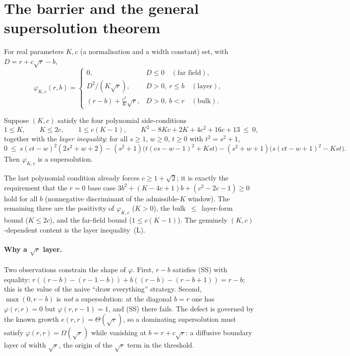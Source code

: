 \section{The barrier and the general supersolution theorem}

\begin{definition}\label{def:phiBar}
\leanok
{}
For real parameters $K,c$ (a normalisation and a width constant) set, with
$D=r+c\sqrt r-b$,
\[
  \varphi_{K,c}(r,b)=
  \begin{cases}
    0, & D\le 0 \quad(\text{far field}),\\[2pt]
    D^2/(K\sqrt r), & D>0,\ r\le b \quad(\text{layer}),\\[2pt]
    (r-b)+\tfrac{c^2}{K}\sqrt r, & D>0,\ b<r \quad(\text{bulk}).
  \end{cases}
\]
\end{definition}

\begin{theorem}\label{thm:general}
\leanok
{}
Suppose $(K,c)$ satisfy the four polynomial side-conditions
\[
  1\le K,\qquad K\le 2c,\qquad 1\le c(K-1),\qquad
  K^2-8Kc+2K+4c^2+16c+13\ \le\ 0,
\]
together with the \emph{layer inequality}: for all $s\ge1$, $w\ge0$, $t\ge0$ with
$t^2=s^2+1$,
\[
  0\ \le\ s(ct-w)^2(2s^2+w+2)-(s^2+1)\big(t(cs-w-1)^2+Kst\big)
          -(s^2+w+1)\big(s(ct-w+1)^2-Kst\big). \tag{L}
\]
Then $\varphi_{K,c}$ is a supersolution.
\end{theorem}

The last polynomial condition already forces $c\ge 1+\sqrt2$; it is exactly the
requirement that the $r=0$ base case $3b^2+(K-4c+1)b+(c^2-2c-1)\ge0$ hold for all
$b$ (nonnegative discriminant of the admissible-$K$ window). The remaining three
are the positivity of $\varphi_{K,c}$ ($K>0$), the bulk~$\le$~layer-form bound
($K\le2c$), and the far-field bound ($1\le c(K-1)$). The genuinely
$(K,c)$-dependent content is the layer inequality~(L).

\paragraph{Why a $\sqrt r$ layer.}
Two observations constrain the shape of $\varphi$. First, $r-b$ satisfies (SS) with
equality: $r((r-b)-(r-1-b))+b((r-b)-(r-b+1))=r-b$; this is the value of the naive
``draw everything'' strategy. Second, $\max(0,r-b)$ is \emph{not} a supersolution:
at the diagonal $b=r$ one has $\varphi(r,r)=0$ but $\varphi(r,r-1)=1$, and (SS)
there fails. The defect is governed by the known growth $e(r,r)=\Theta(\sqrt r)$,
so a dominating supersolution must satisfy $\varphi(r,r)=\Omega(\sqrt r)$ while
vanishing at $b=r+c\sqrt r$: a diffusive boundary layer of width $\sqrt r$, the
origin of the $\sqrt r$ term in the threshold.

